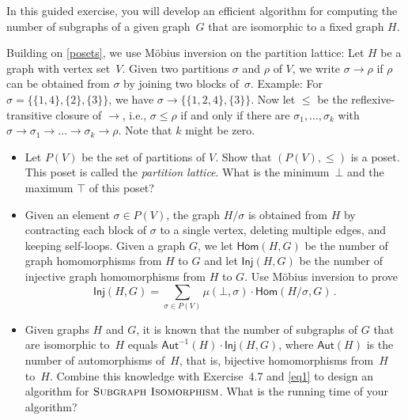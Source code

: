 \documentclass[english]{uebung_cs}
\begin{document}
\begin{exercise}
  In this guided exercise, you will develop an efficient algorithm for computing the number of subgraphs of a given graph~\(G\) that are isomorphic to a fixed graph \( H \).

  Building on \ref{posets}, we use Möbius inversion on the partition lattice:
  Let $H$ be a graph with vertex set~$V$. Given two partitions $\sigma$ and $\rho$ of $V$, we write $\sigma \rightarrow \rho$ if $\rho$ can be obtained from $\sigma$ by joining two blocks of~$\sigma$. Example: For $\sigma = \{ \{1,4\}, \{2\}, \{3\} \}$, we have $\sigma \rightarrow \{ \{1,2,4\}, \{3\} \}$. Now let $\leq$ be the reflexive-transitive closure of $\rightarrow$, i.e., $\sigma \leq \rho$ if and only if there are $\sigma_1,\dots,\sigma_k$ with $\sigma \rightarrow \sigma_1 \rightarrow \dots \rightarrow \sigma_k \rightarrow\rho$. Note that $k$ might be zero.
  \begin{itemize}
    \item Let $P(V)$ be the set of partitions of $V$. Show that $(P(V),\leq)$ is a poset. This poset is called the \emph{partition lattice}. What is the minimum~$\bot$ and the maximum $\top$ of this poset?
    \item Given an element $\sigma \in P(V)$, the graph $H/\sigma$ is obtained from $H$ by contracting each block of $\sigma$ to a single vertex, deleting multiple edges, and keeping self-loops. Given a graph $G$, we let $\mathsf{Hom}(H,G)$ be the number of graph homomorphisms from $H$ to $G$ and let $\mathsf{Inj}(H,G)$ be the number of injective graph homomorphisms from $H$ to $G$. Use Möbius inversion to prove
          \begin{equation}\label{eq1}
            \mathsf{Inj}(H,G) = \sum_{\sigma \in P(V)} \mu(\bot,\sigma)\cdot \mathsf{Hom}(H/\sigma,G)\,.
          \end{equation}
    \item Given graphs $H$ and $G$, it is known that the number of subgraphs of $G$ that are isomorphic to~$H$ equals $\mathsf{Aut}^{-1}(H)\cdot \mathsf{Inj}(H,G)$, where $\mathsf{Aut}(H)$ is the number of automorphisms of~$H$, that is, bijective homomorphisms from~$H$ to~$H$. Combine this knowledge with Exercise~4.7 and \eqref{eq1} to design an algorithm for $\textsc{Subgraph Isomorphism}$. What is the running time of your algorithm?
  \end{itemize}
\end{exercise}
\end{document}
